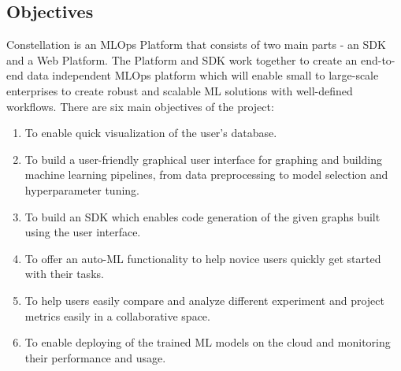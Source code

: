 \documentclass[12pt,a4paper]{report}     %
\begin{document}
\begin{normalsize}
\section{Objectives}
{\setlength{\baselineskip}{1.1\baselineskip}
Constellation is an MLOps Platform that consists of two main parts - an SDK and a Web Platform. The Platform and SDK work together to create an end-to-end data independent MLOps platform which will enable small to large-scale enterprises to create robust and scalable ML solutions with well-defined workflows. There are six main objectives of the project:
\begin{enumerate}
\item To enable quick visualization of the user's database.
\item To build a user-friendly graphical user interface for graphing and building machine learning pipelines, from data preprocessing to model selection and hyperparameter tuning.
\item To build an SDK which enables code generation of the given graphs built using the user interface.
\item To offer an auto-ML functionality to help novice users quickly get started with their tasks.
\item To help users easily compare and analyze different experiment and project metrics  easily in a collaborative space.
\item To enable deploying of the trained ML models on the cloud and monitoring their performance and usage.
\end{enumerate}
}

\end{normalsize}
\end{document}
